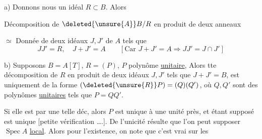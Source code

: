 a) Donnons nous un idéal $R\subset B$. Alors

Décomposition de $\deleted{\unsure{A}}B/R$ en produit de deux anneaux

$\simeq$ Donnée de deux idéaux $J,J'$ de $A$ tels que
\[
JJ'=R,\quad J+J'=A\qquad [\text{Car }J+J'=A\Rightarrow JJ'=J\cap J']
\]

b) Supposons $B=A[T]$,  $R=(P)$, $P$ polynôme
\uline{unitaire}, Alors tte décomposition de $R$ en
produit de deux idéaux $J,J'$ tels que $J+J'=B$,
est uniquement de la forme $(\deleted{\unsure{R}}P)=(Q)(Q')$, où
$Q,Q'$ sont des polynômes \uline{unitaires} tels que
$P=QQ'$.

Si elle est  par une telle déc,
alors $P$ est unique à une unité près,
et étant supposé  est unique
\deleted{[N.B. tout} [petite vérification \ldots.].  De l'unicité résulte que
l'on peut supposer $\operatorname{Spec} A$ \uline{local}. Alors pour
l'existence, on note que c'est vrai sur les
